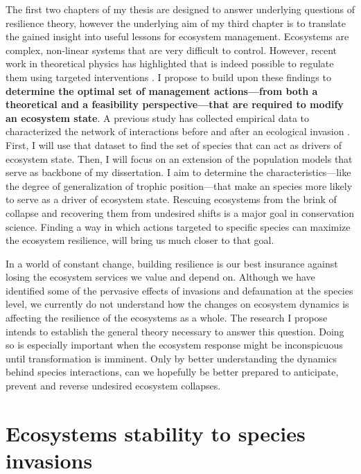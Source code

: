 \documentclass[a4paper]{article}
\begin{document}
The first two chapters of my thesis are designed to answer underlying questions of resilience theory, however the underlying aim of my third chapter is to translate the gained insight into useful lessons for ecosystem management.
Ecosystems are complex, non-linear systems that are very difficult to control.
However, recent work in theoretical physics has highlighted that is indeed possible to regulate them using targeted interventions \autocite{Cornelius2013}.
I propose to build upon these findings to \textbf{determine the optimal set of management actions---from both a theoretical and a feasibility perspective---that are required to modify an ecosystem state}.
A previous study has collected empirical data to characterized the network of interactions before and after an ecological invasion \autocite{Bartomeus2008}.
First, I will use that dataset to find the set of species that can act as drivers of ecosystem state.
Then, I will focus on an extension of the population models that serve as backbone of my dissertation.
I aim to determine the characteristics---like the degree of generalization of trophic position---that make an species more likely to serve as a driver of ecosystem state.
Rescuing ecosystems from the brink of collapse and recovering them from undesired shifts is a major goal in conservation science.
Finding a way in which actions targeted to specific species can maximize the ecosystem resilience, will bring us much closer to that goal.

In a world of constant change, building resilience is our best insurance against losing the ecosystem services we value and depend on.
Although we have identified some of the pervasive effects of invasions and defaunation at the species level, we currently do not understand how the changes on ecosystem dynamics is affecting the resilience of the ecosystems as a whole.
The research I propose intends to establish the general theory necessary to answer this question.
Doing so is especially important when the ecosystem response might be inconspicuous until transformation is imminent.
Only by better understanding the dynamics behind species interactions, can we hopefully be better prepared to anticipate, prevent and reverse undesired ecosystem collapses.









\section{Ecosystems stability to species invasions} \label{chapter1}
\end{document}
